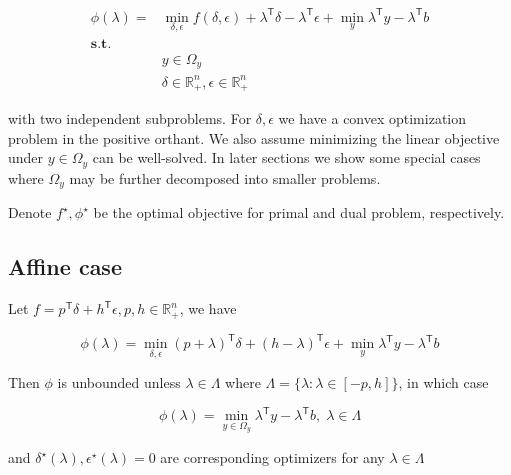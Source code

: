\documentclass[../main]{subfiles}
\begin{document}
\begin{equation}\label{eq:dual}
  \begin{aligned}
    \phi(\lambda) = & \min_{\delta, \epsilon} f(\delta, \epsilon) + \lambda^\mathsf{T}\delta - \lambda^\mathsf{T} \epsilon+ \min_y \lambda^\mathsf{T} y - \lambda^\mathsf{T} b \\
    \mathbf{s.t.}   &                                                                                                                                                          \\
                    & y \in \Omega_y                                                                                                                                           \\
                    & \delta \in \mathbb{R}^n_+ , \epsilon \in \mathbb{R}^n_+
  \end{aligned}
\end{equation}

with two independent subproblems.
For \(\delta, \epsilon\) we have a convex optimization problem in the positive orthant.
We also assume minimizing the linear objective under \(y\in \Omega_y\) can be well-solved.
In later sections we show some special cases where \(\Omega_y\) may be further decomposed into smaller problems.

Denote $f^\star, \phi^\star$ be the optimal objective for primal and dual problem, respectively.


\subsection{Affine case}\label{affine-case}

Let \(f=p^\mathsf{T}\delta + h^\mathsf{T} \epsilon, p, h \in \mathbb R_+^n\), we have

\[\phi(\lambda) = \min_{\delta, \epsilon} (p+ \lambda)^\mathsf{T}\delta + (h - \lambda)^\mathsf{T} \epsilon+ \min_y \lambda^\mathsf{T} y - \lambda^\mathsf{T} b\]

Then \(\phi\) is unbounded unless \(\lambda \in \Lambda\) where
\(\Lambda = \{\lambda: \lambda \in [-p, h]\}\), in which case

\[\phi(\lambda) = \min_{y\in \Omega_y} \lambda^\mathsf{T} y - \lambda^\mathsf{T} b,\; \lambda\in \Lambda\]

and \(\delta^\star(\lambda), \epsilon^\star(\lambda)= 0\) are corresponding optimizers
for any \(\lambda \in \Lambda\)
\end{document}
